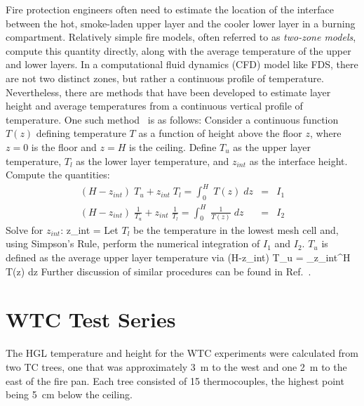 Fire protection engineers often need to estimate the location of the
interface between the hot, smoke-laden upper layer and the cooler
lower layer in a burning compartment.  Relatively simple fire models,
often referred to as {\em two-zone models}, compute this quantity
directly, along with the average temperature of the upper and lower
layers.  In a computational fluid dynamics (CFD) model like FDS, there
are not two distinct zones, but rather a continuous profile of
temperature. Nevertheless, there are methods that have been developed
to estimate layer height and average temperatures from a continuous
vertical profile of temperature. One such
method~\cite{Janssens:JFS1992} is as follows: Consider a continuous
function $T(z)$ defining temperature $T$ as a function of height above
the floor $z$, where $z=0$ is the floor and $z=H$ is the
ceiling. Define $T_u$ as the upper layer temperature, $T_l$ as the
lower layer temperature, and $z_{int}$ as the interface
height. Compute the quantities:
\begin{eqnarray*} (H-z_{int})\; T_u + z_{int} \; T_l = \int_0^H \; T(z) \; dz &=& I_1 \\
                  (H-z_{int})\; \frac{1}{T_u} + z_{int} \; \frac{1}{T_l} = \int_0^H \; \frac{1}{T(z)} \; dz &=& I_2 \end{eqnarray*}
Solve for $z_{int}$:
\be z_{int} =  \ee
Let $T_l$ be the temperature in the lowest mesh cell and, using
Simpson's Rule, perform the numerical integration of $I_1$ and
$I_2$. $T_u$ is defined as the average upper layer temperature via
\be (H-z_{int})\; T_u = \int_{z_{int}}^H \; T(z) \; dz \ee
Further discussion of similar procedures can be found in Ref.~\cite{He:1}.

\section{WTC Test Series}

The HGL temperature and height for the WTC experiments were calculated from two TC trees, one that was approximately 3~m to the west and one
2~m to the east of the fire pan. Each tree consisted of 15 thermocouples, the highest point being 5~cm below the ceiling.

